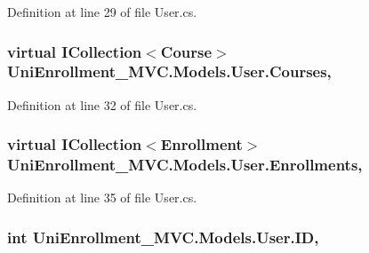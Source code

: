 Definition at line 29 of file User.\+cs.

\subsubsection[{\texorpdfstring{Courses}{Courses}}]{\setlength{\rightskip}{0pt plus 5cm}virtual I\+Collection$<${\bf Course}$>$ Uni\+Enrollment\+\_\+\+M\+V\+C.\+Models.\+User.\+Courses\hspace{0.3cm}{\ttfamily [get]}, {\ttfamily [set]}}\hypertarget{class_uni_enrollment___m_v_c_1_1_models_1_1_user_a62d03b5f502392b690ba4a97e319b032}{}\label{class_uni_enrollment___m_v_c_1_1_models_1_1_user_a62d03b5f502392b690ba4a97e319b032}


Definition at line 32 of file User.\+cs.

\subsubsection[{\texorpdfstring{Enrollments}{Enrollments}}]{\setlength{\rightskip}{0pt plus 5cm}virtual I\+Collection$<${\bf Enrollment}$>$ Uni\+Enrollment\+\_\+\+M\+V\+C.\+Models.\+User.\+Enrollments\hspace{0.3cm}{\ttfamily [get]}, {\ttfamily [set]}}\hypertarget{class_uni_enrollment___m_v_c_1_1_models_1_1_user_a5ebaaaefeb0b09ea8a85dd1a77178891}{}\label{class_uni_enrollment___m_v_c_1_1_models_1_1_user_a5ebaaaefeb0b09ea8a85dd1a77178891}


Definition at line 35 of file User.\+cs.

\subsubsection[{\texorpdfstring{ID}{ID}}]{\setlength{\rightskip}{0pt plus 5cm}int Uni\+Enrollment\+\_\+\+M\+V\+C.\+Models.\+User.\+ID\hspace{0.3cm}{\ttfamily [get]}, {\ttfamily [set]}}\hypertarget{class_uni_enrollment___m_v_c_1_1_models_1_1_user_adee6f0ebfaebca34888fb5378a437bfa}{}\label{class_uni_enrollment___m_v_c_1_1_models_1_1_user_adee6f0ebfaebca34888fb5378a437bfa}


